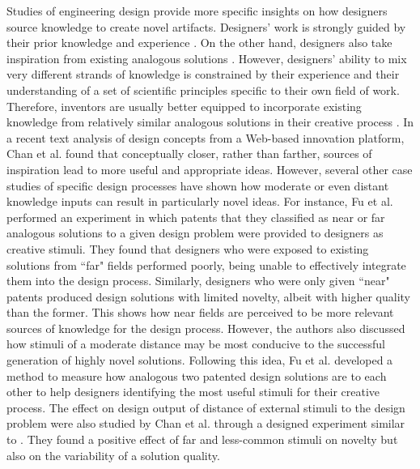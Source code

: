 \documentclass{dsj}
\begin{document}
Studies of engineering design provide more specific insights on how designers source knowledge to create novel artifacts.
Designers' work is strongly guided by their prior knowledge and experience \cite{Hatchuel2009, Hatchuel2003, Hatchuel2004}. On the other hand, designers also take inspiration from existing analogous solutions \cite{Chan2015, Reich2012, Shai2004}. However, designers' ability to mix very different strands of knowledge is constrained by their experience and their understanding of a set of scientific principles specific to their own field of work. Therefore, inventors are usually better equipped to incorporate existing knowledge from relatively similar analogous solutions in their creative process \cite{Linsey2007, Linsey2012}. In a recent text analysis of design concepts from a Web-based innovation platform, Chan et al. \cite{Chan2015} found that conceptually closer, rather than farther, sources of inspiration lead to more useful and appropriate ideas. However, several other case studies of specific design processes have shown how moderate \cite{Fu2013} or even distant knowledge inputs \cite{Tseng2008, Gentner1997, Wilson2010} can result in particularly novel ideas. For instance, Fu et al. \cite{Fu2013} performed an experiment in which patents that they classified as near or far analogous solutions to a given design problem were provided to designers as creative stimuli. They found that designers who were exposed to existing solutions from ``far" fields performed poorly, being unable to effectively integrate them into the design process. Similarly, designers who were only given ``near" patents produced design solutions with limited novelty, albeit with higher quality than the former. This shows how near fields are perceived to be more relevant sources of knowledge for the design process. However, the authors also discussed how stimuli of a moderate distance may be most conducive to the successful generation of highly novel solutions. Following this idea, Fu et al. \cite{Fu2013a, Fu2015} developed a method to measure how analogous two patented design solutions are to each other to help designers identifying the most useful stimuli for their creative process. The effect on design output of distance of external stimuli to the design problem were also studied by Chan et al. \cite{Chan2011} through a designed experiment similar to \cite{Fu2013}. They found a positive effect of far and less-common stimuli on novelty but also on the variability of a solution quality.
\end{document}
